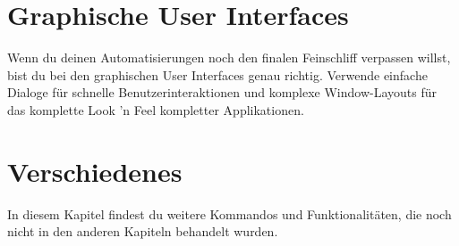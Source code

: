 \documentclass[DIV=17, parskip=half]{scrreprt}
\begin{document}
	\chapter{Graphische User Interfaces}
		Wenn du deinen Automatisierungen noch den finalen Feinschliff verpassen willst, bist du bei den graphischen User Interfaces genau richtig. Verwende einfache Dialoge f\"ur schnelle Benutzerinteraktionen und komplexe Window-Layouts f\"ur das komplette Look 'n Feel kompletter Applikationen.
		
		
		
	\chapter{Verschiedenes}
		In diesem Kapitel findest du weitere Kommandos und Funktionalit\"aten, die noch nicht in den anderen Kapiteln behandelt wurden.
		
		
		
		
		
		
\end{document}
